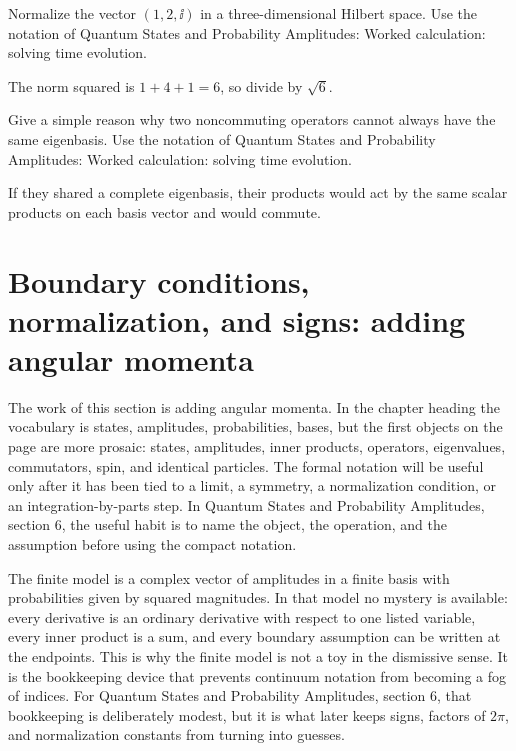 \begin{exercise}
Normalize the vector \((1,2,\ii)\) in a three-dimensional Hilbert space.  Use the notation of Quantum States and Probability Amplitudes: Worked calculation: solving time evolution.
\begin{answer}
The norm squared is \(1+4+1=6\), so divide by \(\sqrt6\).
\end{answer}
\end{exercise}

\begin{exercise}
Give a simple reason why two noncommuting operators cannot always have the same eigenbasis.  Use the notation of Quantum States and Probability Amplitudes: Worked calculation: solving time evolution.
\begin{answer}
If they shared a complete eigenbasis, their products would act by the same scalar products on each basis vector and would commute.
\end{answer}
\end{exercise}



\section{Boundary conditions, normalization, and signs: adding angular momenta}

The work of this section is adding angular momenta.  In the chapter heading the vocabulary is states, amplitudes, probabilities, bases, but the first objects on the page are more prosaic: states, amplitudes, inner products, operators, eigenvalues, commutators, spin, and identical particles.  The formal notation will be useful only after it has been tied to a limit, a symmetry, a normalization condition, or an integration-by-parts step.  In Quantum States and Probability Amplitudes, section 6, the useful habit is to name the object, the operation, and the assumption before using the compact notation.

The finite model is a complex vector of amplitudes in a finite basis with probabilities given by squared magnitudes.  In that model no mystery is available: every derivative is an ordinary derivative with respect to one listed variable, every inner product is a sum, and every boundary assumption can be written at the endpoints.  This is why the finite model is not a toy in the dismissive sense.  It is the bookkeeping device that prevents continuum notation from becoming a fog of indices.  For Quantum States and Probability Amplitudes, section 6, that bookkeeping is deliberately modest, but it is what later keeps signs, factors of \(2\pi\), and normalization constants from turning into guesses.

